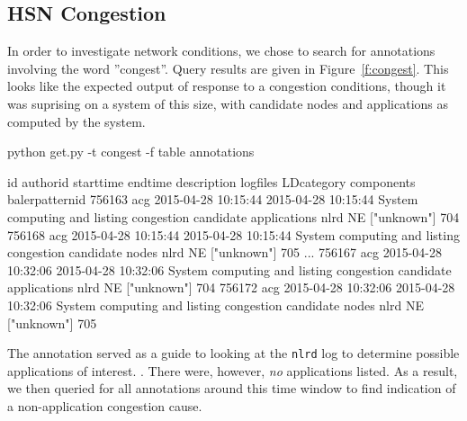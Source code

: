 \subsection{HSN Congestion}
\label{s:congestion}

In order to investigate network conditions, we chose to search for annotations involving the
word ''congest''. Query results are given in Figure~\ref{f:congest}. This looks like the
expected output of response to a congestion conditions, though it was suprising
on a system of this size, with candidate nodes and applications
as computed by the system.

\begin{figure*}
\begin{annol}
python get.py  -t congest -f table annotations

id	authorid	starttime	endtime		description	logfiles	LDcategory	components	balerpatternid
756163	acg	2015-04-28 10:15:44	2015-04-28 10:15:44	System computing and listing congestion candidate applications		nlrd	NE	["unknown"]	704
756168	acg	2015-04-28 10:15:44	2015-04-28 10:15:44	System computing and listing congestion candidate nodes		nlrd	NE	["unknown"]	705
...
756167	acg	2015-04-28 10:32:06	2015-04-28 10:32:06	System computing and listing congestion candidate applications		nlrd	NE	["unknown"]	704
756172	acg	2015-04-28 10:32:06	2015-04-28 10:32:06	System computing and listing congestion candidate nodes		nlrd	NE	["unknown"]	705
\end{annol}
\caption{Congestion response annotations occur 5 times within 15 minutes. The annotation regarding
candidate applications drove investigation of the \texttt{nlrd} log file, but no applications
were listed.}
\label{f:congest}
\end{figure*}

The annotation served as a guide to looking at the \texttt{nlrd} log to determine possible
applications of interest. . There were, however, \emph{no} applications listed.
As a result, we then queried for all annotations around this time window to find indication
of a non-application congestion cause.

